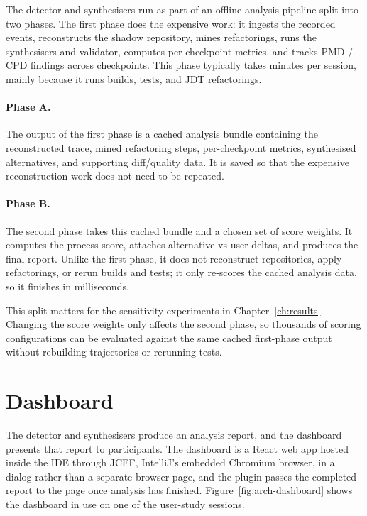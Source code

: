 The detector and synthesisers run as part of an offline analysis pipeline split into two phases. The first phase does the expensive work: it ingests the recorded events, reconstructs the shadow repository, mines refactorings, runs the synthesisers and validator, computes per-checkpoint metrics, and tracks PMD / CPD findings across checkpoints. This phase typically takes minutes per session, mainly because it runs builds, tests, and JDT refactorings.

\paragraph{Phase A.}
The output of the first phase is a cached analysis bundle containing the reconstructed trace, mined refactoring steps, per-checkpoint metrics, synthesised alternatives, and supporting diff/quality data. It is saved so that the expensive reconstruction work does not need to be repeated.

\paragraph{Phase B.}
The second phase takes this cached bundle and a chosen set of score weights. It computes the process score, attaches alternative-vs-user deltas, and produces the final report. Unlike the first phase, it does not reconstruct repositories, apply refactorings, or rerun builds and tests; it only re-scores the cached analysis data, so it finishes in milliseconds.

This split matters for the sensitivity experiments in Chapter~\ref{ch:results}. Changing the score weights only affects the second phase, so thousands of scoring configurations can be evaluated against the same cached first-phase output without rebuilding trajectories or rerunning tests.

\section{Dashboard}
\label{sec:arch-dashboard}

The detector and synthesisers produce an analysis report, and the dashboard presents that report to participants. The dashboard is a React web app hosted inside the IDE through JCEF, IntelliJ's embedded Chromium browser, in a dialog rather than a separate browser page, and the plugin passes the completed report to the page once analysis has finished. Figure~\ref{fig:arch-dashboard} shows the dashboard in use on one of the user-study sessions.

